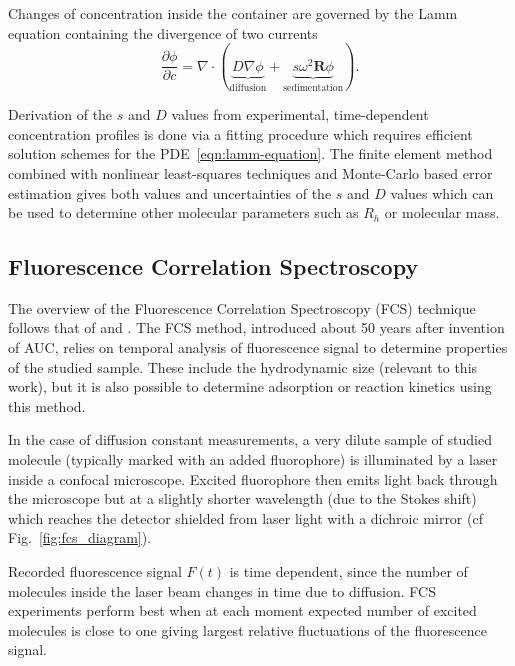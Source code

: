\documentclass{doctoral}
\newcommand{\pd}{\partial}
\begin{document}
Changes of concentration inside the container are governed by the Lamm equation containing the divergence of two currents
\begin{equation}
    \frac{\pd \phi}{\pd c} = \nabla \cdot \left( \underbrace{D \nabla \phi}_\text{diffusion} + \underbrace{s \omega^2 \bm{R} \phi}_\text{sedimentation} \right).
    \label{eqn:lamm-equation}
\end{equation}

Derivation of the $s$ and $D$ values from experimental, time-dependent concentration profiles is done via a fitting procedure which requires efficient solution schemes for the PDE~\eqref{eqn:lamm-equation}\cite{Demeler_2016,Cao_2005}.
The finite element method combined with nonlinear least-squares techniques and Monte-Carlo based error estimation gives both values and uncertainties of the $s$ and $D$ values which can be used to determine other molecular parameters such as $R_h$ or molecular mass.

\subsection{Fluorescence Correlation Spectroscopy}
\label{sec:FCS}

The overview of the Fluorescence Correlation Spectroscopy (FCS) technique follows that of \textcite{Tompson_2002} and \textcite{Gregor_2008}.
The FCS method, introduced about 50 years after invention of AUC, relies on temporal analysis of fluorescence signal to determine properties of the studied sample.
These include the hydrodynamic size (relevant to this work), but it is also possible to determine adsorption or reaction kinetics using this method.

In the case of diffusion constant measurements, a very dilute sample of studied molecule (typically marked with an added fluorophore) is illuminated by a laser inside a confocal microscope.
Excited fluorophore then emits light back through the microscope but at a slightly shorter wavelength (due to the Stokes shift) which reaches the detector shielded from laser light with a dichroic mirror (cf Fig.~\ref{fig:fcs_diagram}).

Recorded fluorescence signal $F(t)$ is time dependent, since the number of molecules inside the laser beam changes in time due to diffusion.
FCS experiments perform best when at each moment expected number of excited molecules is close to one giving largest relative fluctuations of the fluorescence signal.
\end{document}
